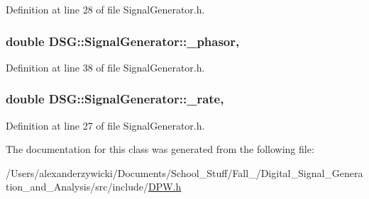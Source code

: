 Definition at line 28 of file Signal\+Generator.\+h.

\hypertarget{classDSG_1_1SignalGenerator_ac2271b582bf699275f077ecb642a8cd9}{
\subsubsection[{\+\_\+phasor}]{\setlength{\rightskip}{0pt plus 5cm}double D\+S\+G\+::\+Signal\+Generator\+::\+\_\+phasor\hspace{0.3cm}{\ttfamily [protected]}, {\ttfamily [inherited]}}}\label{classDSG_1_1SignalGenerator_ac2271b582bf699275f077ecb642a8cd9}


Definition at line 38 of file Signal\+Generator.\+h.

\hypertarget{classDSG_1_1SignalGenerator_aa10f6c85d9adee901139ea7fb346f39d}{
\subsubsection[{\+\_\+rate}]{\setlength{\rightskip}{0pt plus 5cm}double D\+S\+G\+::\+Signal\+Generator\+::\+\_\+rate\hspace{0.3cm}{\ttfamily [protected]}, {\ttfamily [inherited]}}}\label{classDSG_1_1SignalGenerator_aa10f6c85d9adee901139ea7fb346f39d}


Definition at line 27 of file Signal\+Generator.\+h.



The documentation for this class was generated from the following file\+:\begin{DoxyCompactItemize}
\item 
/\+Users/alexanderzywicki/\+Documents/\+School\+\_\+\+Stuff/\+Fall\+\_/\+Digital\+\_\+\+Signal\+\_\+\+Generation\+\_\+and\+\_\+\+Analysis/src/include/\hyperlink{DPW_8h}{D\+P\+W.\+h}\end{DoxyCompactItemize}

